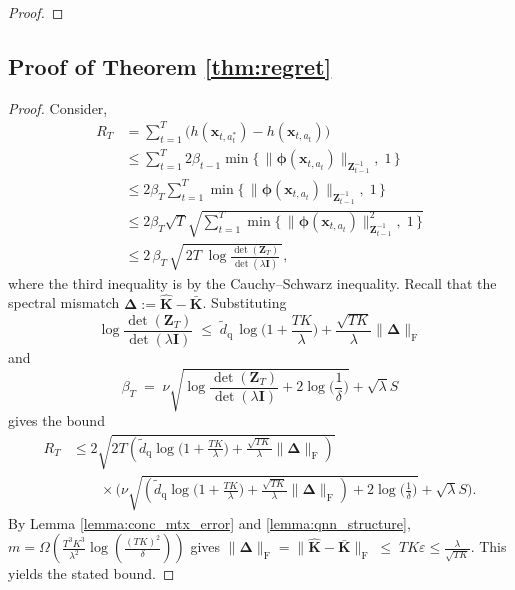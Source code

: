 \documentclass[pdflatex,sn-mathphys-num]{sn-jnl}%
\theoremstyle{thmstyleone}%
\theoremstyle{thmstyletwo}%
\theoremstyle{thmstylethree}%
\newcommand{\bigOmega}{\Omega}
\newcommand{\xbf}{\mathbf{x}}
\newcommand{\Ibf}{\mathbf{I}}
\newcommand{\phibf}{\bm{\phi}}
\newcommand{\Zbf}{\mathbf{Z}}
\begin{document}
\begin{appendices}
\begin{proof}
\end{proof}





\subsection{Proof of Theorem \ref{thm:regret}}

\thmregret*

\begin{proof}
Consider,
\begin{align*}
    R_T &= \sum_{t=1}^T\big(h(\xbf_{t,a_t^*})-h(\xbf_{t,a_t})\big) \\
    &\leq \sum_{t=1}^T 2\beta_{t-1}\min\bigl\{\,\|\phibf(\xbf_{t,a_t})\|_{\Zbf_{t-1}^{-1}},\;1\,\bigr\} \\
    &\leq 2\beta_T \sum_{t=1}^T \min\bigl\{\,\|\phibf(\xbf_{t,a_t})\|_{\Zbf_{t-1}^{-1}},\;1\,\bigr\} \\
    &\leq 2\beta_T \sqrt{T} \sqrt{\sum_{t=1}^T \min\bigl\{\,\|\phibf(\xbf_{t,a_t})\|^2_{\Zbf_{t-1}^{-1}},\;1\,\bigr\}} \\
    &\leq 2\,\beta_T\,\sqrt{\,2T\;\log\frac{\det(\Zbf_T)}{\det(\lambda \Ibf)}\,},
\end{align*}
where the third inequality is by the Cauchy--Schwarz inequality. Recall that the spectral mismatch $\bm{\Delta} := 
\hat{\mathbf K}-\bar{\mathbf K}$.
Substituting  
\[ 
\log\frac{\det( \Zbf_T)}{\det(\lambda \Ibf)}
\;\le\; \widetilde{d}_{\mathrm{q}}\,\log\!\Big(1+\frac{TK}{\lambda}\Big) + \frac{\sqrt{TK}}{\lambda}\|\bm{\Delta}\|_{\mathrm{F}}
\]
and $$\beta_{T} \;=\; \nu\sqrt{\log\frac{\det(\Zbf_{T})}{\det(\lambda \Ibf)}+2\log\Big(\frac{1}{\delta}\Big)}
+\sqrt{\lambda}S$$ gives the bound
\begin{align*}
    R_T&\le
2 \sqrt{2T\left( \widetilde{d}_{\mathrm{q}} \log\Big(1+\frac{TK}{\lambda}\Big)+\frac{\sqrt{TK}}{\lambda}\|\bm{\Delta}\|_{\mathrm{F}} \right)} \\
&\qquad \times\Big(\nu\sqrt{\left( \widetilde{d}_{\mathrm{q}}\log\Big(1+\frac{TK}{\lambda}\Big)+\frac{\sqrt{TK}}{\lambda}\|\bm{\Delta}\|_{\mathrm{F}} \right) + 2\log\Big(\frac{1}{\delta}\Big)}+\sqrt{\lambda}S\Big).
\end{align*}
By Lemma \ref{lemma:conc_mtx_error} and \ref{lemma:qnn_structure}, $m = \bigOmega\left( \frac{T^3K^3}{\lambda^2}\log\left(\frac{(TK)^2}{\delta}\right) \right)$ gives $\|\bm{\Delta}\|_{\mathrm{F}}=
\big\|\hat{\mathbf K}-\bar{\mathbf K}\big\|_{\mathrm{F}}  \;\le\; TK\varepsilon \leq \frac{\lambda}{\sqrt{TK}}
$. This yields  the stated bound.
\end{proof}























\end{appendices}
\end{document}
